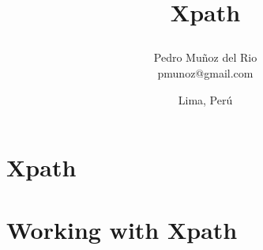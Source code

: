 \documentclass[12pt,a4paper,oneside, openany]{book}
\title{ 
 \begin{center}
  {Xpath}\\
 \end{center}
}
\author{Pedro Muñoz del Rio\\
        pmunoz@gmail.com}
\date{Lima, Perú}
\begin{document}
\renewcommand{\baselinestretch}{1.5} %
\renewcommand{\contentsname}{Index}
\renewcommand{\listfigurename}{List of Figures}
\renewcommand{\chaptername}{Chapter}
\renewcommand{\bibname}{Sources}
\renewcommand{\figurename}{Figure}
\renewcommand{\tablename}{Table}

 \maketitle %
 
  \frontmatter  %
 
  
 \tableofcontents %
 \listoffigures   %
      
 \mainmatter  %


 \chapter{Xpath}
    

 \chapter{Working with Xpath}
    
   

   
   
\end{document}
